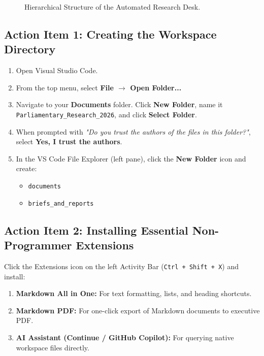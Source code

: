 \documentclass[11pt, a4paper]{report}
\begin{document}
\begin{figure}[htbp]
  \centering
  \caption{Hierarchical Structure of the Automated Research Desk.}
  \label{fig:workspace_tree}
\end{figure}

\subsection{Action Item 1: Creating the Workspace Directory}
\begin{enumerate}[label=\textbf{Step \arabic*:}]
    \item Open Visual Studio Code.
    \item From the top menu, select \textbf{File $\rightarrow$ Open Folder...}
    \item Navigate to your \textbf{Documents} folder. Click \textbf{New Folder}, name it \texttt{Parliamentary\_Research\_2026}, and click \textbf{Select Folder}.
    \item When prompted with \textit{"Do you trust the authors of the files in this folder?"}, select \textbf{Yes, I trust the authors}.
    \item In the VS Code File Explorer (left pane), click the \textbf{New Folder} icon and create:
    \begin{itemize}[label=-]
        \item \texttt{documents}
        \item \texttt{briefs\_and\_reports}
    \end{itemize}
\end{enumerate}

\subsection{Action Item 2: Installing Essential Non-Programmer Extensions}
Click the Extensions icon on the left Activity Bar (\texttt{Ctrl + Shift + X}) and install:
\begin{enumerate}
    \item \textbf{Markdown All in One:} For text formatting, lists, and heading shortcuts.
    \item \textbf{Markdown PDF:} For one-click export of Markdown documents to executive PDF.
    \item \textbf{AI Assistant (Continue / GitHub Copilot):} For querying native workspace files directly.
\end{enumerate}
\end{document}
